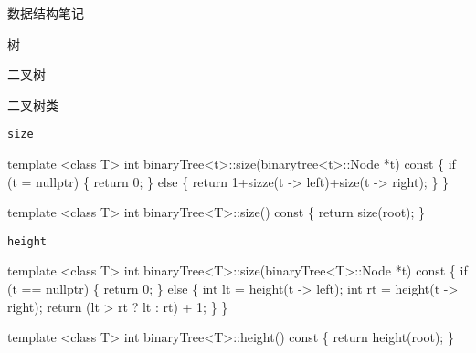 \documentclass[
  ignorenonframetext,
]{beamer}
\newenvironment{Shaded}{}{}
\newcommand{\NormalTok}[1]{#1}
\begin{document}
\begin{frame}[fragile]{数据结构笔记}
\begin{block}{树}
\begin{block}{二叉树}
\begin{block}{二叉树类}
\begin{block}{\texttt{size}}
\protect{}\label{size}
\begin{Shaded}
\begin{Highlighting}[]
\NormalTok{template \textless{}class T\textgreater{}}
\NormalTok{int binaryTree\textless{}t\textgreater{}::size(binarytree\textless{}t\textgreater{}::Node *t) const}
\NormalTok{\{}
\NormalTok{  if (t = nullptr)}
\NormalTok{  \{}
\NormalTok{    return 0;}
\NormalTok{  \}}
\NormalTok{  else}
\NormalTok{  \{}
\NormalTok{    return 1+sizze(t {-}\textgreater{} left)+size(t {-}\textgreater{} right);}
\NormalTok{  \}}
\NormalTok{\}}
\end{Highlighting}
\end{Shaded}

\begin{Shaded}
\begin{Highlighting}[]
\NormalTok{template \textless{}class T\textgreater{}}
\NormalTok{int binaryTree\textless{}T\textgreater{}::size() const}
\NormalTok{\{}
\NormalTok{  return size(root);}
\NormalTok{\}}
\end{Highlighting}
\end{Shaded}
\end{block}

\begin{block}{\texttt{height}}
\protect{}\label{height}
\begin{Shaded}
\begin{Highlighting}[]
\NormalTok{template \textless{}class T\textgreater{}}
\NormalTok{int binaryTree\textless{}T\textgreater{}::size(binaryTree\textless{}T\textgreater{}::Node *t) const}
\NormalTok{\{}
\NormalTok{  if (t == nullptr)}
\NormalTok{  \{}
\NormalTok{    return 0;}
\NormalTok{  \}}
\NormalTok{  else}
\NormalTok{  \{}
\NormalTok{    int lt = height(t {-}\textgreater{} left);}
\NormalTok{    int rt = height(t {-}\textgreater{} right);}
\NormalTok{    return (lt \textgreater{} rt ? lt : rt) + 1;}
\NormalTok{  \}}
\NormalTok{\}}
\end{Highlighting}
\end{Shaded}

\begin{Shaded}
\begin{Highlighting}[]
\NormalTok{template \textless{}class T\textgreater{}}
\NormalTok{int binaryTree\textless{}T\textgreater{}::height() const}
\NormalTok{\{}
\NormalTok{  return height(root);}
\NormalTok{\}}
\end{Highlighting}
\end{Shaded}
\end{block}


\end{block}
\end{block}
\end{block}
\end{frame}
\end{document}
